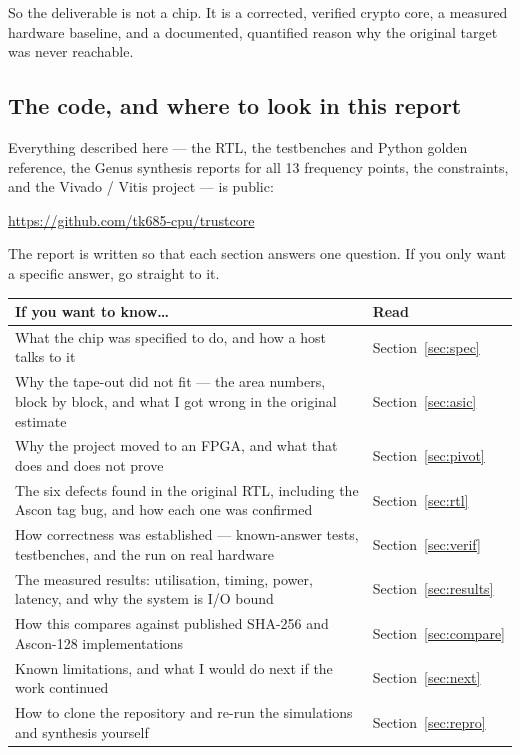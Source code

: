 \documentclass[11pt,a4paper]{article}
\begin{document}
So the deliverable is not a chip. It is a corrected, verified crypto core, a
measured hardware baseline, and a documented, quantified reason why the
original target was never reachable.

\subsection*{The code, and where to look in this report}

Everything described here --- the RTL, the testbenches and Python golden
reference, the Genus synthesis reports for all 13 frequency points, the
constraints, and the Vivado / Vitis project --- is public:

\begin{center}\large
\url{https://github.com/tk685-cpu/trustcore}
\end{center}

The report is written so that each section answers one question. If you only
want a specific answer, go straight to it.

\begin{table}[h]
\centering\small
\begin{tabular}{@{}p{}l@{}}
\toprule
\textbf{If you want to know\ldots} & \textbf{Read} \\
\midrule
What the chip was specified to do, and how a host talks to it
  & Section~\ref{sec:spec} \\
Why the tape-out did not fit --- the area numbers, block by block, and what I
got wrong in the original estimate
  & Section~\ref{sec:asic} \\
Why the project moved to an FPGA, and what that does and does not prove
  & Section~\ref{sec:pivot} \\
The six defects found in the original RTL, including the Ascon tag bug, and
how each one was confirmed
  & Section~\ref{sec:rtl} \\
How correctness was established --- known-answer tests, testbenches, and the
run on real hardware
  & Section~\ref{sec:verif} \\
The measured results: utilisation, timing, power, latency, and why the system
is I/O bound
  & Section~\ref{sec:results} \\
How this compares against published SHA-256 and Ascon-128 implementations
  & Section~\ref{sec:compare} \\
Known limitations, and what I would do next if the work continued
  & Section~\ref{sec:next} \\
How to clone the repository and re-run the simulations and synthesis yourself
  & Section~\ref{sec:repro} \\
\bottomrule
\end{tabular}
\end{table}
\end{document}
